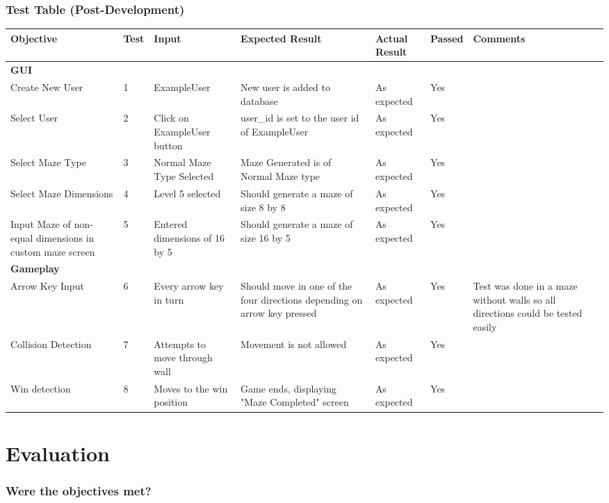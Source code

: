 \documentclass{article}
\begin{document}
\section{Test Table (Post-Development)}
\begin{tabular}{|P{3cm}|P{1cm}|P{3cm}|P{3cm}|P{3cm}|P{1.2cm}|P{2cm}| }
\hline
 Objective & Test & Input & Expected Result & Actual Result & Passed & Comments \\
\hline
\textbf{GUI }&&&&&& \\
\hline
 Create New User & 1 & ExampleUser & New user is added to database & As expected & Yes & \\
\hline
Select User & 2 & Click on ExampleUser button & user\_id is set to the user id of ExampleUser & As expected & Yes & \\
\hline
 Select Maze Type & 3 & Normal Maze Type Selected & Maze Generated is of Normal Maze type & As expected & Yes & \\
\hline
 Select Maze Dimensions & 4 & Level 5 selected & Should generate a maze of size 8 by 8 & As expected & Yes & \\
\hline
 Input Maze of non-equal dimensions in custom maze screen & 5 & Entered dimensions of 16 by 5 & Should generate a maze of size 16 by 5 & As expected & Yes & \\
\hline
\textbf{Gameplay}&&&&&& \\
\hline
 Arrow Key Input & 6 & Every arrow key in turn & Should move in one of the four directions depending on arrow key pressed & As expected & Yes & Test was done in a maze without walls so all directions could be tested easily\\
\hline
 Collision Detection & 7 & Attempts to move through wall & Movement is not allowed & As expected & Yes & \\
\hline
 Win detection & 8 & Moves to the win position & Game ends, displaying "Maze Completed" screen & As expected & Yes & \\
\hline
\end{tabular}

\clearpage
\part{Evaluation}
\section{Were the objectives met?}
\end{document}
